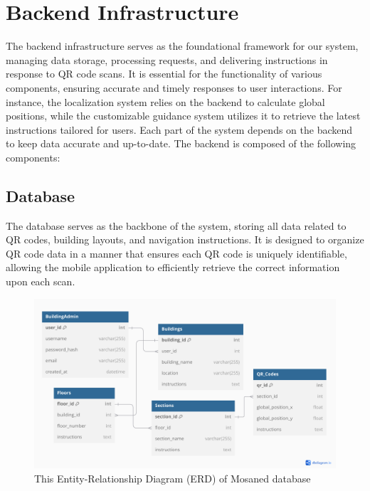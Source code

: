 




\section{Backend Infrastructure}

The backend infrastructure serves as the foundational framework for our system, managing data storage, processing requests, and delivering instructions in response to QR code scans. It is essential for the functionality of various components, ensuring accurate and timely responses to user interactions. For instance, the localization system relies on the backend to calculate global positions, while the customizable guidance system utilizes it to retrieve the latest instructions tailored for users. Each part of the system depends on the backend to keep data accurate and up-to-date. The backend is composed of the following components:
\subsection{Database}

The database serves as the backbone of the system, storing all data related to QR codes, building layouts, and navigation instructions. It is designed to organize QR code data in a manner that ensures each QR code is uniquely identifiable, allowing the mobile application to efficiently retrieve the correct information upon each scan.

\begin{figure}[h]
	\centering
	\includegraphics[width=1\linewidth]{assets/ch3/our_ERD}
	\caption{This Entity-Relationship Diagram (ERD) of Mosaned database}
	\label{fig:our_ERD}
\end{figure}

